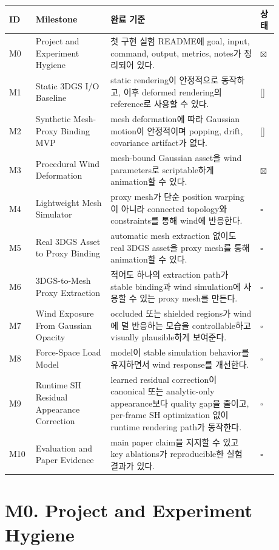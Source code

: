 \documentclass[10pt]{article}
\newcommand{\todo}{\textcolor{TodoGray}{\(\square\)}}
\newcommand{\progress}{\textcolor{ProgressBlue}{[{\raisebox{0.1ex}{\(\sim\)}}]}}
\newcommand{\done}{\textcolor{DoneGreen}{\(\boxtimes\)}}
\begin{document}
\small
\renewcommand{\arraystretch}{1.22}
\begin{longtable}{@{}L{0.065\linewidth}L{0.255\linewidth}L{0.505\linewidth}L{0.055\linewidth}@{}}
\toprule
ID & Milestone & 완료 기준 & 상태 \\
\midrule
M0 & Project and Experiment Hygiene & 첫 구현 실험 README에 goal, input, command, output, metrics, notes가 정리되어 있다. & \done \\
M1 & Static 3DGS I/O Baseline & static rendering이 안정적으로 동작하고, 이후 deformed rendering의 reference로 사용할 수 있다. & \progress \\
M2 & Synthetic Mesh-Proxy Binding MVP & mesh deformation에 따라 Gaussian motion이 안정적이며 popping, drift, covariance artifact가 없다. & \progress \\
M3 & Procedural Wind Deformation & mesh-bound Gaussian asset을 wind parameters로 scriptable하게 animation할 수 있다. & \done \\
M4 & Lightweight Mesh Simulator & proxy mesh가 단순 position warping이 아니라 connected topology와 constraints를 통해 wind에 반응한다. & \todo \\
M5 & Real 3DGS Asset to Proxy Binding & automatic mesh extraction 없이도 real 3DGS asset을 proxy mesh를 통해 animation할 수 있다. & \todo \\
M6 & 3DGS-to-Mesh Proxy Extraction & 적어도 하나의 extraction path가 stable binding과 wind simulation에 사용할 수 있는 proxy mesh를 만든다. & \todo \\
M7 & Wind Exposure From Gaussian Opacity & occluded 또는 shielded regions가 wind에 덜 반응하는 모습을 controllable하고 visually plausible하게 보여준다. & \todo \\
M8 & Force-Space Load Model & model이 stable simulation behavior를 유지하면서 wind response를 개선한다. & \todo \\
M9 & Runtime SH Residual Appearance Correction & learned residual correction이 canonical 또는 analytic-only appearance보다 quality gap을 줄이고, per-frame SH optimization 없이 runtime rendering path가 동작한다. & \todo \\
M10 & Evaluation and Paper Evidence & main paper claim을 지지할 수 있고 key ablations가 reproducible한 실험 결과가 있다. & \todo \\
\bottomrule
\end{longtable}
\normalsize

\newpage

\section{M0. Project and Experiment Hygiene}
\end{document}

